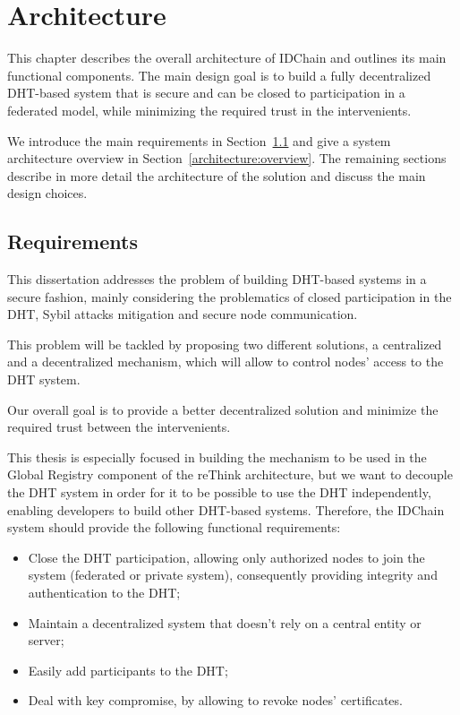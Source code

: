 \chapter{Architecture}
\label{chapter:architecture}

This chapter describes the overall architecture of IDChain and outlines its main functional components.
The main design goal is to build a fully decentralized DHT-based system that is secure and can be closed to participation in a federated model, while minimizing the required trust in the intervenients.

We introduce the main requirements in Section~\ref{architecture:requirements} and give a system architecture overview in Section~\ref{architecture:overview}.
The remaining sections describe in more detail the architecture of the solution and discuss the main design choices.

\section{Requirements}\label{architecture:requirements}

This dissertation addresses the problem of building DHT-based systems in a secure fashion, mainly considering the problematics of closed participation in the DHT, Sybil attacks mitigation and secure node communication.

This problem will be tackled by proposing two different solutions, a centralized and a decentralized mechanism, which will allow to control nodes' access to the DHT system.

Our overall goal is to provide a better decentralized solution and minimize the required trust between the intervenients.

This thesis is especially focused in building the mechanism to be used in the Global Registry component of the reThink architecture, but we want to decouple the DHT system in order for it to be possible to use the DHT independently, enabling developers to build other DHT-based systems.
Therefore, the IDChain system should provide the following functional requirements:

\begin{itemize}
  \item Close the DHT participation, allowing only authorized nodes to join the system (federated or private system), consequently providing integrity and authentication to the DHT;
  \item Maintain a decentralized system that doesn't rely on a central entity or server;
  \item Easily add participants to the DHT;
  \item Deal with key compromise, by allowing to revoke nodes' certificates.
\end{itemize}

